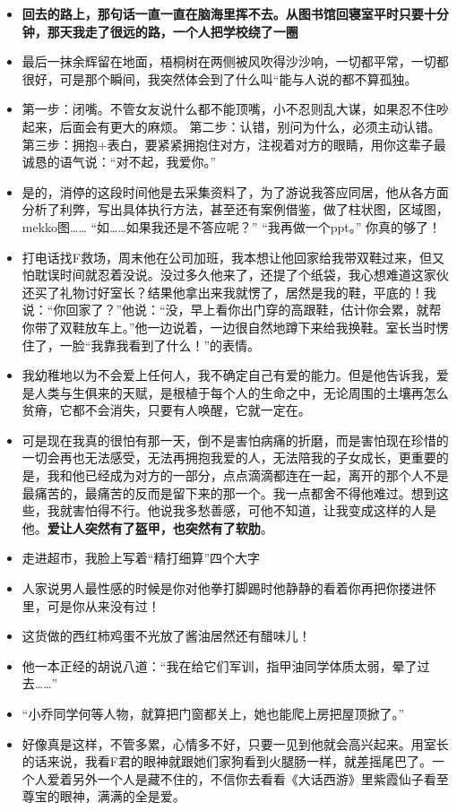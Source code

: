 \documentclass[UTF8,a4paper,8pt]{ctexart}
\begin{document}
\begin{itemize}
 	\item \textbf{回去的路上，那句话一直一直在脑海里挥不去。从图书馆回寝室平时只要十分钟，那天我走了很远的路，一个人把学校绕了一圈}
 	\item 最后一抹余辉留在地面，梧桐树在两侧被风吹得沙沙响，一切都平常，一切都很好，可是那个瞬间，我突然体会到了什么叫“能与人说的都不算孤独。
 	\item 第一步：闭嘴。不管女友说什么都不能顶嘴，小不忍则乱大谋，如果忍不住吵起来，后面会有更大的麻烦。 第二步：认错，别问为什么，必须主动认错。 第三步：拥抱+表白，要紧紧拥抱住对方，注视着对方的眼睛，用你这辈子最诚恳的语气说：“对不起，我爱你。”
 	\item 是的，消停的这段时间他是去采集资料了，为了游说我答应同居，他从各方面分析了利弊，写出具体执行方法，甚至还有案例借鉴，做了柱状图，区域图，mekko图…… “如……如果我还是不答应呢？” “我再做一个ppt。” 你真的够了！
 	\item 打电话找F救场，周末他在公司加班，我本想让他回家给我带双鞋过来，但又怕耽误时间就忍着没说。没过多久他来了，还提了个纸袋，我心想难道这家伙还买了礼物讨好室长？结果他拿出来我就愣了，居然是我的鞋，平底的！我说：“你回家了？”他说：“没，早上看你出门穿的高跟鞋，估计你会累，就帮你带了双鞋放车上。”他一边说着，一边很自然地蹲下来给我换鞋。室长当时愣住了，一脸“我靠我看到了什么！”的表情。
 	\item 我幼稚地以为不会爱上任何人，我不确定自己有爱的能力。但是他告诉我，爱是人类与生俱来的天赋，是根植于每个人的生命之中，无论周围的土壤再怎么贫瘠，它都不会消失，只要有人唤醒，它就一定在。
 	\item 可是现在我真的很怕有那一天，倒不是害怕病痛的折磨，而是害怕现在珍惜的一切会再也无法感受，无法再拥抱我爱的人，无法陪我的子女成长，更重要的是，我和他已经成为对方的一部分，点点滴滴都连在一起，离开的那个人不是最痛苦的，最痛苦的反而是留下来的那一个。我一点都舍不得他难过。想到这些，我就害怕得不行。他说我多愁善感，可他不知道，让我变成这样的人是他。\textbf{爱让人突然有了盔甲，也突然有了软肋}。
 	\item 走进超市，我脸上写着“精打细算”四个大字
 	\item 人家说男人最性感的时候是你对他拳打脚踢时他静静的看着你再把你搂进怀里，可是你从来没有过！
 	\item 这货做的西红柿鸡蛋不光放了酱油居然还有醋味儿！
 	\item 他一本正经的胡说八道：“我在给它们军训，指甲油同学体质太弱，晕了过去……”
 	\item “小乔同学何等人物，就算把门窗都关上，她也能爬上房把屋顶掀了。”
 	\item 好像真是这样，不管多累，心情多不好，只要一见到他就会高兴起来。用室长的话来说，我看F君的眼神就跟她们家狗看到火腿肠一样，就差摇尾巴了。一个人爱着另外一个人是藏不住的，不信你去看看《大话西游》里紫霞仙子看至尊宝的眼神，满满的全是爱。

\end{itemize}
\end{document}
